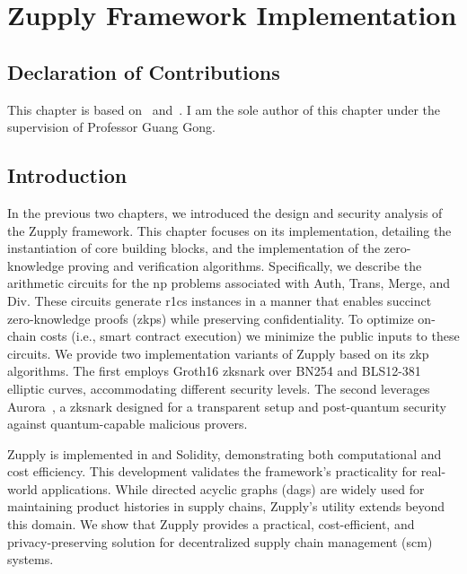 \chapter{Zupply Framework Implementation}\label{ch:zupply_implementation}

\section*{Declaration of Contributions}
This chapter is based on~\cite{Badakhshan2024Zupply} and~\cite{Badakhshan2025AuroraZupply}. I am the sole author of this chapter under the supervision of Professor Guang Gong.

\section{Introduction}

In the previous two chapters, we introduced the design and security analysis of the Zupply framework. This chapter focuses on its implementation, detailing the 
instantiation of core building blocks, and the implementation of the zero-knowledge proving and verification algorithms. Specifically, we describe the arithmetic circuits for the \gls{np} problems associated with \textsf{Auth}, \textsf{Trans}, \textsf{Merge}, and \textsf{Div}. These circuits generate \gls{r1cs} instances in a manner that enables succinct zero-knowledge proofs (\gls{zkp}s) while preserving confidentiality. To optimize on-chain costs (i.e., smart contract execution) we minimize the public inputs to these circuits. 
We provide two implementation variants of Zupply based on its \gls{zkp} algorithms. The first employs Groth16 \cite{Groth2016} \gls{zksnark} over BN254 \cite{BNcurve} and BLS12-381~\cite{BLS_curve2003} elliptic curves, accommodating different security levels. The second leverages Aurora~\cite{Aurora2019}, a \gls{zksnark} designed for a transparent setup and post-quantum security against quantum-capable malicious provers.

Zupply is implemented in \CC and Solidity, demonstrating both computational and cost efficiency. This development validates the framework's practicality for real-world applications. While directed acyclic graphs (\gls{dag}s) are widely used for maintaining product histories in supply chains, Zupply's utility extends beyond this domain. We show that Zupply provides a practical, cost-efficient, and privacy-preserving solution for decentralized supply chain management (\gls{scm}) systems.

